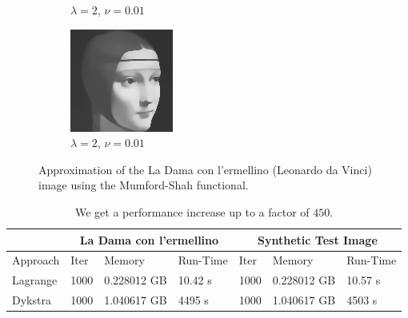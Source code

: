 \documentclass[abstracton]{scrreprt}
\begin{document}
\begin{figure}[!ht]
\begin{subfigure}[b]{0.32\textwidth}
                    \caption{$\lambda = 2$, $\nu = 0.01$}
                \end{subfigure}
                \begin{subfigure}[b]{0.32\textwidth}
                    \includegraphics[width=\textwidth]{img/lagrange/ladama.png}
                    \caption{$\lambda = 2$, $\nu = 0.01$}
                \end{subfigure}
                \caption[La Dama image approximation with convex relaxed Mumford-Shah.]{Approximation of the La Dama con l'ermellino (Leonardo da Vinci) image using the Mumford-Shah functional.}
            \label{fig:ladama_ms_compare}
            \end{figure}
            \begin{table}[!ht]
                \centering
                \begin{tabular}{| l | l | l | l | l | l | l |}
                    \hline
                    & \multicolumn{3}{|c|}{La Dama con l'ermellino} & \multicolumn{3}{|c|}{Synthetic Test Image} \\ \hline\hline
                    Approach & Iter & Memory & Run-Time & Iter & Memory & Run-Time \\ \hline
                    Lagrange & 1000 & 0.228012 GB & 10.42 s & 1000 & 0.228012 GB & 10.57 s \\ \hline
                    Dykstra & 1000 & 1.040617 GB & 4495 s & 1000 & 1.040617 GB & 4503 s \\ \hline
                \end{tabular}
                \caption[Run-Time comparison: Lagrange vs. Dykstra.]{We get a performance increase up to a factor of $450$.}
                \label{tab:run_time_compare_lagrange_vs_dykstra}
            \end{table}
\end{document}
